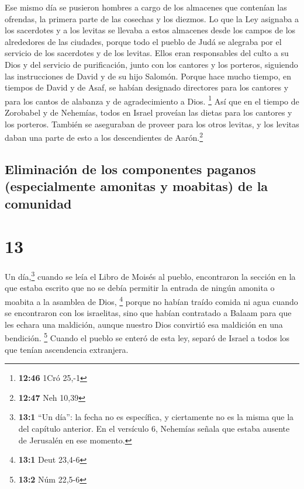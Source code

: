  Ese mismo día se pusieron hombres a cargo de los
almacenes que contenían las ofrendas, la primera parte de las cosechas y
los diezmos. Lo que la Ley asignaba a los sacerdotes y a los levitas se
llevaba a estos almacenes desde los campos de los alrededores de las
ciudades, porque todo el pueblo de Judá se alegraba por el servicio de
los sacerdotes y de los levitas.  Ellos eran responsables
del culto a su Dios y del servicio de purificación, junto con los
cantores y los porteros, siguiendo las instrucciones de David y de su
hijo Salomón.  Porque hace mucho tiempo, en tiempos de
David y de Asaf, se habían designado directores para los cantores y para
los cantos de alabanza y de agradecimiento a Dios. \footnote{\textbf{12:46}
  1Cró 25,-1}  Así que en el tiempo de Zorobabel y de
Nehemías, todos en Israel proveían las dietas para los cantores y los
porteros. También se aseguraban de proveer para los otros levitas, y los
levitas daban una parte de esto a los descendientes de Aarón.\footnote{\textbf{12:47}
  Neh 10,39}

\hypertarget{eliminaciuxf3n-de-los-componentes-paganos-especialmente-amonitas-y-moabitas-de-la-comunidad}{%
\subsection{Eliminación de los componentes paganos (especialmente
amonitas y moabitas) de la
comunidad}\label{eliminaciuxf3n-de-los-componentes-paganos-especialmente-amonitas-y-moabitas-de-la-comunidad}}

\hypertarget{section-12}{%
\section{13}\label{section-12}}

 Un día,\footnote{\textbf{13:1} ``Un día'': la fecha no es
  específica, y ciertamente no es la misma que la del capítulo anterior.
  En el versículo 6, Nehemías señala que estaba ausente de Jerusalén en
  ese momento.} cuando se leía el Libro de Moisés al pueblo, encontraron
la sección en la que estaba escrito que no se debía permitir la entrada
de ningún amonita o moabita a la asamblea de Dios, \footnote{\textbf{13:1}
  Deut 23,4-6}  porque no habían traído comida ni agua
cuando se encontraron con los israelitas, sino que habían contratado a
Balaam para que les echara una maldición, aunque nuestro Dios convirtió
esa maldición en una bendición. \footnote{\textbf{13:2} Núm 22,5-6}
 Cuando el pueblo se enteró de esta ley, separó de Israel
a todos los que tenían ascendencia extranjera.

